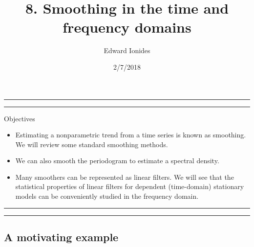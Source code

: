 \documentclass[]{article}
\title{8. Smoothing in the time and frequency domains}
\author{Edward Ionides}
\date{2/7/2018}
\begin{document}
\maketitle

{
\setcounter{tocdepth}{2}
\tableofcontents
}
\newcommand\prob{\mathbb{P}}
\newcommand\E{\mathbb{E}}
\newcommand\var{\mathrm{Var}}
\newcommand\cov{\mathrm{Cov}}
\newcommand\loglik{\ell}
\newcommand\R{\mathbb{R}}
\newcommand\data[1]{#1^*}
\newcommand\params{\, ; \,}
\newcommand\transpose{\scriptsize{T}}
\newcommand\eqspace{\quad\quad\quad}
\newcommand\lik{\mathscr{L}}
\newcommand\profileloglik[1]{\ell^\mathrm{profile}_#1}
\newcommand\ar{\phi}
\newcommand\ma{\psi}
\newcommand\AR{\Phi}
\newcommand\MA{\Psi}
\newcommand\ev{u}





\begin{center}\rule{0.5\linewidth}{\linethickness}\end{center}

\begin{center}\rule{0.5\linewidth}{\linethickness}\end{center}

Objectives

\begin{itemize}
\item
  Estimating a nonparametric trend from a time series is known as
  smoothing. We will review some standard smoothing methods.
\item
  We can also smooth the periodogram to estimate a spectral density.
\item
  Many smoothers can be represented as linear filters. We will see that
  the statistical properties of linear filters for dependent
  (time-domain) stationary models can be conveniently studied in the
  frequency domain.
\end{itemize}

\begin{center}\rule{0.5\linewidth}{\linethickness}\end{center}

\begin{center}\rule{0.5\linewidth}{\linethickness}\end{center}

\subsection{A motivating example}\label{a-motivating-example}
\end{document}
